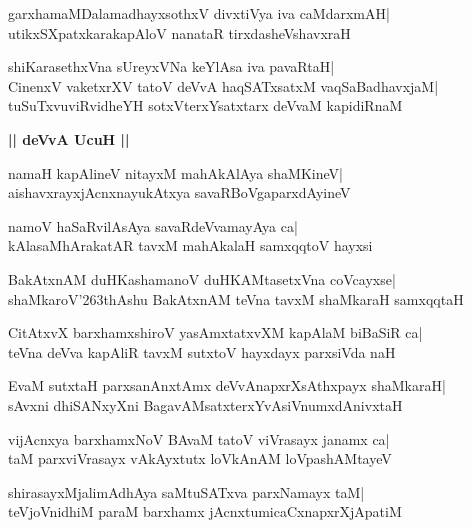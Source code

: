 \documentclass[twoside,12pt,openright]{book}
\def\S{\char'263}
\newcounter{shloka}[chapter]
\def\uvaca#1{\centerline{{\large\textbf{#1}}}}
\begin{document}
\begin{shloka}%
garxhamaMDalamadhayxsothxV divxtiVya iva caMdarxmAH|\\
utikxSXpatxkarakapAloV nanataR tirxdasheVshavxraH
\end{shloka}

\begin{shloka}%
shiKarasethxVna sUreyxVNa keYlAsa iva pavaRtaH|\\
CinenxV vaketxrXV tatoV deVvA haqSATxsatxM vaqSaBadhavxjaM|\\
tuSuTxvuviRvidheYH sotxVterxYsatxtarx deVvaM kapidiRnaM
\end{shloka}

\uvaca{|| deVvA UcuH ||}
\begin{shloka}%
namaH kapAlineV nitayxM mahAkAlAya shaMKineV|\\
aishavxrayxjAcnxnayukAtxya savaRBoVgaparxdAyineV
\end{shloka}

\begin{shloka}%
namoV haSaRvilAsAya savaRdeVvamayAya ca|\\
kAlasaMhArakatAR tavxM mahAkalaH samxqqtoV hayxsi
\end{shloka}

\begin{shloka}%
BakAtxnAM duHKashamanoV duHKAMtasetxVna coVcayxse|\\
shaMkaroV\S thAshu BakAtxnAM teVna tavxM shaMkaraH samxqqtaH
\end{shloka}

\begin{shloka}%
CitAtxvX barxhamxshiroV yasAmxtatxvXM kapAlaM biBaSiR ca|\\
teVna deVva kapAliR tavxM sutxtoV hayxdayx parxsiVda naH
\end{shloka}

\begin{shloka}%
EvaM sutxtaH parxsanAnxtAmx deVvAnapxrXsAthxpayx shaMkaraH|\\
sAvxni dhiSANxyXni BagavAMsatxterxYvAsiVnumxdAnivxtaH
\end{shloka}

\begin{shloka}%
vijAcnxya barxhamxNoV BAvaM tatoV viVrasayx janamx ca|\\
taM parxviVrasayx vAkAyxtutx loVkAnAM loVpashAMtayeV
\end{shloka}

\begin{shloka}%
shirasayxMjalimAdhAya saMtuSATxva parxNamayx taM|\\
teVjoVnidhiM paraM barxhamx jAcnxtumicaCxnapxrXjApatiM
\end{shloka}
\end{document}
